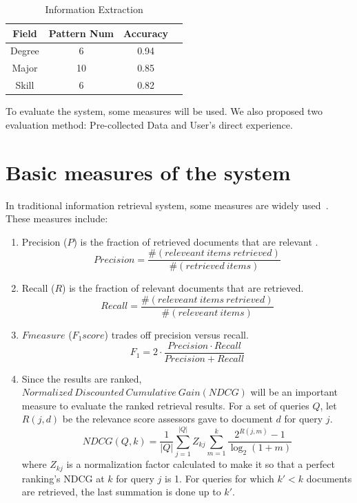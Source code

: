 \begin{table}[ht]
\caption{Information Extraction} %
\centering %
\begin{tabular}{   | c | c | c | c |   }
 \hline
                     Field   & Pattern Num & Accuracy     \\
 \hline
                     Degree & 6         & 0.94         \\
 \hline
                     Major  & 10        & 0.85      \\
 \hline
                     Skill  & 6         & 0.82        \\
 \hline
\end{tabular}
\label{tab:ieaccura} %
\end{table}


To evaluate the system, some measures will be used. We also proposed two evaluation method: Pre-collected Data and User's direct experience.

\section{Basic measures of the system}

In traditional information retrieval system, some measures are widely used~\cite{manning2008introduction}. These measures include:

\begin{enumerate}
    \item Precision ($P$) is the fraction of retrieved documents that are relevant .
       $$  Precision =  \frac{ \#(releveant~items~ retrieved)}{ \#(retrieved~items)}$$
    \item Recall ($R$) is the fraction of relevant documents that are retrieved.
       $$  Recall =  \frac{ \#(releveant~items~ retrieved)}{ \#(releveant~items)}$$
    \item $F measure$ ($F_1 score$) trades off precision versus recall.
       $$ F_1 = 2 \cdot \frac{ Precision \cdot Recall}{ Precision + Recall } $$
    \item Since the results are ranked, $ Normalized~Discounted~Cumulative~Gain ( NDCG )$ will be an important measure to evaluate the ranked retrieval results. For a set of queries $Q$, let $R(j,d)$ be the relevance score assessors gave to document $d$ for query $j$.
       $$ NDCG(Q,k) = \frac {1}{|Q|} \sum_{j=1}^{|Q|}{Z_{kj}} \sum_{m=1}^{k} \frac{2^{R(j,m)} - 1}{ \log_2(1+m)} $$
where $Z_{kj}$ is a normalization factor calculated to make it so that a perfect ranking's NDCG at $k$ for query $j$ is 1. For queries for which $k' < k$ documents are retrieved, the last summation is done up to $k'$.

\end{enumerate}


